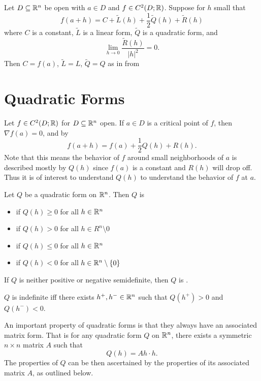 \documentclass[../main.tex]{subfiles}
\begin{document}
\begin{theorem}
    \label{thm:taylorformulaunique}
    Let $D \subseteq \mathbb{R}^n$ be open with $a \in D$ and $f \in C^2(D; \mathbb{R})$. Suppose for $h$ small that
    \[
        f(a + h) = C + \tilde{L}(h) + \frac{1}{2} \tilde{Q}(h) + \tilde{R}(h)
    \]
    where $C$ is a constant, $\tilde{L}$ is a linear form, $\tilde{Q}$ is a quadratic form, and
    \[
        \lim_{h \to 0} \frac{\tilde{R}(h)}{|h|^2} = 0
    .\]
    Then $C = f(a)$, $\tilde{L} = L$, $\tilde{Q} = Q$ as in from 
\end{theorem}

\section{Quadratic Forms}

Let $f \in C^2(D; \mathbb{R})$ for $D \subseteq \mathbb{R}^n$ open. If $a \in D$ is a critical point of $f$, then $\nabla f(a) = 0$, and by 
\[
    f(a+h) = f(a) + \frac{1}{2} Q(h) + R(h)
.\]
Note that this means the behavior of $f$ around small neighborhoods of $a$ is described mostly by $Q(h)$ since $f(a)$ is a constant and $R(h)$ will drop off. Thus it is of interest to understand $Q(h)$ to understand the behavior of $f$ at $a$.

\begin{definition}[Definiteness]
    Let $Q$ be a quadratic form on $\mathbb{R}^n$. Then $Q$ is
    \begin{itemize}
        \item {} if $Q(h) \geq 0$ for all $h \in \mathbb{R}^n$
        \item {} if $Q(h) > 0$ for all $h \in R^n \setminus \qty{0}$
        \item {} if $Q(h) \leq 0$ for all $h \in \mathbb{R}^n$
        \item {} if $Q(h) < 0$ for all $h \in \mathbb{R}^n \setminus \qty{0}$
    \end{itemize}
    If $Q$ is neither positive or negative semidefinite, then $Q$ is .
\end{definition}

\begin{remark}
    $Q$ is indefinite iff there exists $h^{+}, h^{-} \in \mathbb{R}^n$ such that $Q(h^{+}) > 0$ and $Q(h^{-}) < 0$.
\end{remark}

An important property of quadratic forms is that they always have an associated matrix form. That is for any quadratic form $Q$ on $\mathbb{R}^n$, there exists a symmetric $n \times n$ matrix $A$ such that
\[
    Q(h) = Ah \cdot h
.\]
The properties of $Q$ can be then ascertained by the properties of its associated matrix $A$, as outlined below.
\end{document}
